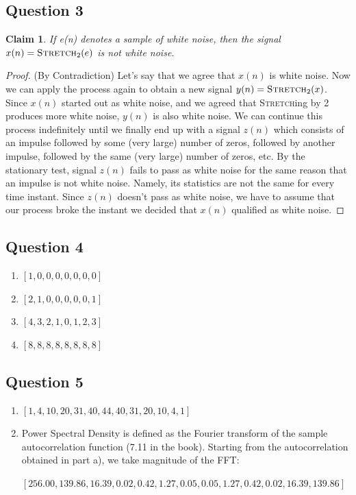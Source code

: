 \documentclass[11pt]{article}
\newtheorem*{claim}{Claim}
\begin{document}
\subsection*{Question 3}

\begin{claim}
If e(n) denotes a sample of white noise, then the signal $x(n) = \textsc{Stretch}_{2}(e)$ is \emph{not} white noise.
\end{claim}

\begin{proof} (By Contradiction)
Let's say that we agree that $x(n)$ is white noise. Now we can apply the process again to obtain a new signal $y(n) = \textsc{Stretch}_{2}(x)$. Since $x(n)$ started out as white noise, and we agreed that \textsc{Stretch}ing by 2 produces more white noise, $y(n)$ is also white noise. We can continue this process indefinitely until we finally end up with a signal $z(n)$ which consists of an impulse followed by some (very large) number of zeros, followed by another impulse, followed by the same (very large) number of zeros, etc. By the stationary test, signal $z(n)$ fails to pass as white noise for the same reason that an impulse is not white noise. Namely, its statistics are not the same for every time instant. Since $z(n)$ doesn't pass as white noise, we have to assume that our process broke the instant we decided that $x(n)$ qualified as white noise.

\end{proof}

\subsection*{Question 4}
\begin{enumerate}
\item $[1, 0, 0, 0, 0, 0, 0, 0]$
\item $[2, 1, 0, 0, 0, 0, 0, 1]$
\item $[4, 3, 2, 1, 0, 1, 2, 3]$
\item $[8, 8, 8, 8, 8, 8, 8, 8]$
\end{enumerate}

\subsection*{Question 5}
\begin{enumerate}
\item $[1, 4, 10, 20, 31, 40, 44, 40, 31, 20, 10, 4, 1]$
\item Power Spectral Density is defined as the Fourier transform of the sample autocorrelation function (7.11 in the book). Starting from the autocorrelation obtained in part a), we take magnitude of the FFT:

$[ 256.00,  139.86,   16.39,    0.02,    0.42,    1.27,   0.05,    0.05,    1.27,    0.42,    0.02,   16.39,   139.86]$

\end{enumerate}
\end{document}
